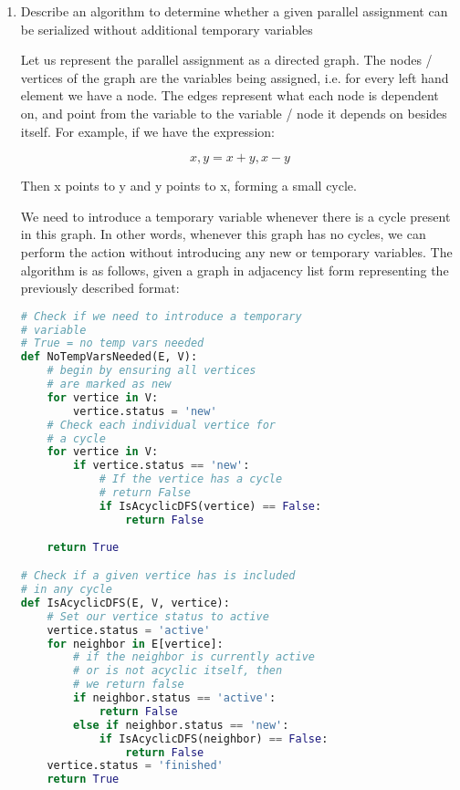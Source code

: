 \documentclass[11pt, letterpaper]{article}
\begin{document}
\begin{enumerate}

\item Describe an algorithm to determine whether a given parallel assignment can be serialized without additional temporary variables

\quad Let us represent the parallel assignment as a directed graph. The nodes / vertices of the graph are the variables being assigned, i.e. for every left hand element we have a node. The edges represent what each node is dependent on, and point from the variable to the variable / node it depends on besides itself. For example, if we have the expression:

$$ x, y = x + y, x - y $$

Then x points to y and y points to x, forming a small cycle.

\quad We need to introduce a temporary variable whenever there is a cycle present in this graph. In other words, whenever this graph has no cycles, we can perform the action without introducing any new or temporary variables. The algorithm is as follows, given a graph in adjacency list form representing the previously described format:

\begin{lstlisting}[language=python]
# Check if we need to introduce a temporary
# variable
# True = no temp vars needed
def NoTempVarsNeeded(E, V):
    # begin by ensuring all vertices
    # are marked as new
    for vertice in V:
        vertice.status = 'new'
    # Check each individual vertice for
    # a cycle
    for vertice in V:
        if vertice.status == 'new':
            # If the vertice has a cycle
            # return False
            if IsAcyclicDFS(vertice) == False:
                return False
            
    return True

# Check if a given vertice has is included
# in any cycle
def IsAcyclicDFS(E, V, vertice):
    # Set our vertice status to active
    vertice.status = 'active'
    for neighbor in E[vertice]:
        # if the neighbor is currently active
        # or is not acyclic itself, then
        # we return false
        if neighbor.status == 'active':
            return False
        else if neighbor.status == 'new':
            if IsAcyclicDFS(neighbor) == False:
                return False
    vertice.status = 'finished'
    return True
\end{lstlisting}

\pagebreak


\end{enumerate}
\end{document}
